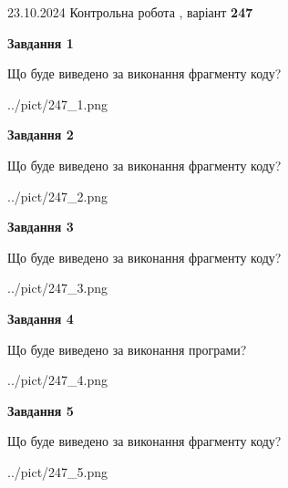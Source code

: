\documentclass[12pt, ukrainian]{article}
\begin{document}
{\Large{23.10.2024 Контрольна робота , варіант  \No \textbf { 247 }\par}}
{
\begin {large}
{\begin {center}\textbf{Завдання 1}\end {center}}

Що буде виведено за виконання фрагменту коду?\par
\begin{center}
	{../pict/247_1.png}
\end{center}
\newpage

{\begin {center}\textbf{Завдання 2}\end {center}}

Що буде виведено за виконання фрагменту коду?\par
\begin{center}
	{../pict/247_2.png}
\end{center}
\newpage

{\begin {center}\textbf{Завдання 3}\end {center}}

Що буде виведено за виконання фрагменту коду?\par
\begin{center}
	{../pict/247_3.png}
\end{center}
\newpage

{\begin {center}\textbf{Завдання 4}\end {center}}

Що буде виведено за виконання програми?\par
\begin{center}
	{../pict/247_4.png}
\end{center}
\newpage

{\begin {center}\textbf{Завдання 5}\end {center}}

Що буде виведено за виконання фрагменту коду?\par
\begin{center}
	{../pict/247_5.png}
\end{center}
\newpage


\end{large}}
\end{document}
